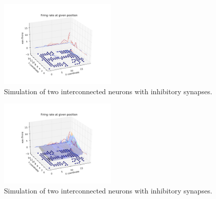 \documentclass[12pt,a4paper,twocolumn]{article}
\begin{document}
\begin{figure}[htbp]
\centering
\includegraphics[width=0.5\textwidth]{figure6_a.png}
\caption{Simulation of two interconnected neurons with inhibitory synapses.\label{fig:part4b}}
\vspace{0.2cm}
\end{figure}
\begin{figure}[htbp]
\centering
\includegraphics[width=0.5\textwidth]{figure6_b.png}
\caption{Simulation of two interconnected neurons with inhibitory synapses.\label{fig:part4b}}
\vspace{0.2cm}
\end{figure}
\end{document}
